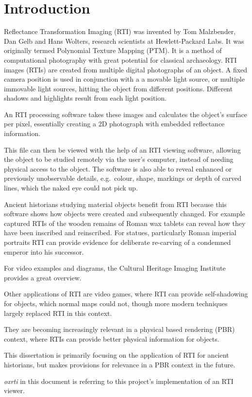\section{Introduction}
Reflectance Transformation Imaging (RTI) was  invented by Tom Malzbender, Dan
Gelb and Hans Wolters, research scientists at Hewlett-Packard Labs\cite*{malzbender_polynomial_2001}. It was originally termed
Polynomial Texture Mapping (PTM). It is a method of computational photography
with great potential for classical archaeology. RTI images (RTIs) are created from
multiple digital photographs of an object. A fixed camera position is used in
conjunction with a a movable light source, or multiple immovable light sources, hitting the object from different positions. Different shadows and highlights result from
each light position.

An RTI processing software takes these images and calculates the object's
surface per pixel, essentially creating a 2D photograph with embedded
reflectance information.

This file can then be viewed with the help of an RTI viewing software, allowing
the object to be studied remotely via the user's computer, instead of needing
physical access to the object. The software is also able to reveal enhanced or
previously unobservable details, e.g.\ colour, shape, markings or depth of
carved lines, which the naked eye could not pick up.

Ancient historians studying material objects benefit from RTI because this
software shows how objects were created and subsequently changed. For example
captured RTIs of the wooden remains of Roman wax tablets can reveal how they
have been inscribed and reinscribed. For statues, particularly Roman imperial
portraits RTI can provide evidence for deliberate re-carving of a condemned
emperor into his successor.

For video examples and diagrams, the Cultural Heritage Imaging Institute provides a great overview\cite*{noauthor_cultural_nodate}.

Other applications of RTI are video games, where RTI can provide self-shadowing
for objects, which normal maps could not, though more modern techniques largely
replaced RTI in this context.

They are becoming increasingly relevant in a physical based rendering (PBR) context,
where RTIs can provide better physical information for objects.

This dissertation is primarily focusing on the application of RTI for ancient
historians, but makes provisions for relevance in a PBR context in the future.

\emph{oxrti} in this document is referring to this project's implementation of an
RTI viewer.